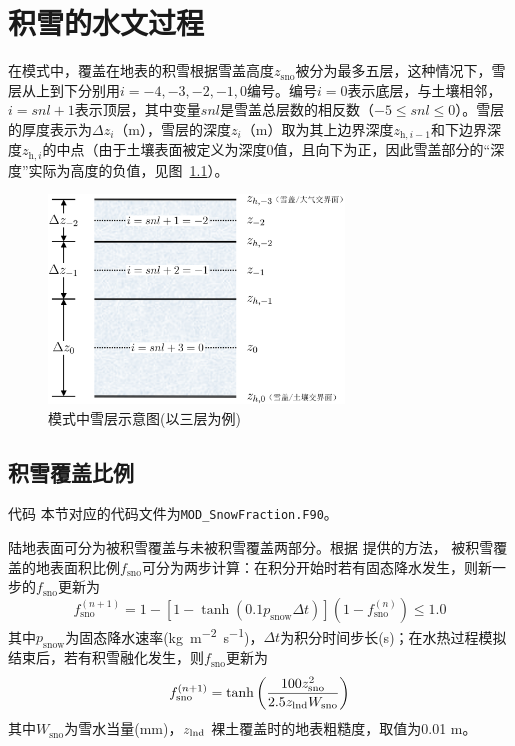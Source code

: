 \chapter{积雪的水文过程}
在模式中，覆盖在地表的积雪根据雪盖高度$z_{\mathrm{sno}}$被分为最多五层，这种情况下，雪层从上到下分别用$i = −4, −3, −2, −1, 0$编号。编号$i = 0$表示底层，与土壤相邻，$i = snl + 1$表示顶层，其中变量$snl$是雪盖总层数的相反数（$-5\leqslant snl\leqslant 0$）。雪层的厚度表示为$\Delta z_i$（m），雪层的深度$z_i$（m）取为其上边界深度$z_{\mathrm{h},i-1}$和下边界深度$z_{\mathrm{h},i}$的中点（由于土壤表面被定义为深度0值，且向下为正，因此雪盖部分的“深度”实际为高度的负值，见图~\ref{fig:模式中积雪雪层示意图}）。
{
  \begin{figure}[htbp]
    \centering
    \includegraphics[width=0.7\textwidth]{Figures/雪盖土壤热力过程/模式中积雪雪层示意图.png}
    \caption{模式中雪层示意图(以三层为例)}
    \label{fig:模式中积雪雪层示意图}
  \end{figure}
}
\section{积雪覆盖比例}
\begin{mymdframed}{代码}
  本节对应的代码文件为\texttt{MOD\_SnowFraction.F90}。
\end{mymdframed}

陆地表面可分为被积雪覆盖与未被积雪覆盖两部分。根据 \citet{swenson2012new}提供的方法，
被积雪覆盖的地表面积比例$f_{\mathrm{sno}}$可分为两步计算：在积分开始时若有固态降水发生，则新一步的$f_{\mathrm{sno}}$更新为
\begin{equation}
  f_{\mathrm{{sno }}}^{(n+1)}=1-\left[1-\tanh\left(0.1 p_{\mathrm{snow}} \Delta t\right)\right]\left(1-f_{\mathrm{{sno }}}^{(n)}\right) \leqslant 1.0
\end{equation}
其中$p_{\mathrm {snow}} $为固态降水速率(\unit{kg.m^{-2}.s^{-1}})，$\Delta t$为积分时间步长(s)；在水热过程模拟结束后，若有积雪融化发生，则$f_{\mathrm{sno}}$更新为
\begin{equation}
  f_{\mathrm{sno}}^{(n+1)}=\tanh{\left(\frac{100 z_{\mathrm{s n o}}^{2}}{2.5 z_{\rm lnd} W_{\mathrm{sno}}}\right)}
\end{equation}
其中$W_{\mathrm{sno}}$为雪水当量(mm)，$z_{\rm lnd}$ 裸土覆盖时的地表粗糙度，取值为0.01 m。

